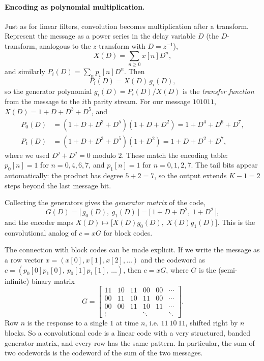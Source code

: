 \paragraph{Encoding as polynomial multiplication.} Just as for linear filters, convolution becomes multiplication after a transform. Represent the message as a power series in the delay variable \(D\) (the \(D\)-transform, analogous to the \(z\)-transform with \(D = z^{-1}\)),
\[X(D) = \sum_{n \geq 0} x[n] D^n,\]
and similarly \(P_i(D) = \sum_n p_i[n] D^n\). Then
\[P_i(D) = X(D)\, g_i(D),\]
so the generator polynomial \(g_i(D) = P_i(D)/X(D)\) is the \emph{transfer function} from the message to the \(i\)th parity stream. For our message \(101011\), \(X(D) = 1 + D + D^3 + D^5\), and
\begin{align*}
P_0(D) &= (1 + D + D^3 + D^5)(1 + D + D^2) = 1 + D^4 + D^6 + D^7, \\
P_1(D) &= (1 + D + D^3 + D^5)(1 + D^2) = 1 + D + D^2 + D^7,
\end{align*}
where we used \(D^j + D^j = 0\) modulo \(2\). These match the encoding table: \(p_0[n] = 1\) for \(n = 0, 4, 6, 7\), and \(p_1[n] = 1\) for \(n = 0, 1, 2, 7\). The tail bits appear automatically: the product has degree \(5 + 2 = 7\), so the output extends \(K - 1 = 2\) steps beyond the last message bit.

Collecting the generators gives the \emph{generator matrix} of the code,
\[G(D) = \big[\, g_0(D),\ g_1(D) \,\big] = \big[\, 1 + D + D^2,\ 1 + D^2 \,\big],\]
and the encoder maps \(X(D) \mapsto \big[X(D) g_0(D),\ X(D) g_1(D)\big]\). This is the convolutional analog of \(c = xG\) for block codes.

The connection with block codes can be made explicit. If we write the message as a row vector \(x = (x[0], x[1], x[2], \ldots)\) and the codeword as \(c = (p_0[0]p_1[0],\ p_0[1]p_1[1],\ \ldots)\), then \(c = xG\), where \(G\) is the (semi-infinite) binary matrix
\[
G = \begin{bmatrix}
11 & 10 & 11 & 00 & 00 & \cdots \\
00 & 11 & 10 & 11 & 00 & \cdots \\
00 & 00 & 11 & 10 & 11 & \cdots \\
\vdots & & & \ddots & & \ddots
\end{bmatrix}.
\]
Row \(n\) is the response to a single \(1\) at time \(n\), i.e. \(11\ 10\ 11\), shifted right by \(n\) blocks. So a convolutional code is a linear code with a very structured, banded generator matrix, and every row has the same pattern. In particular, the sum of two codewords is the codeword of the sum of the two messages.

